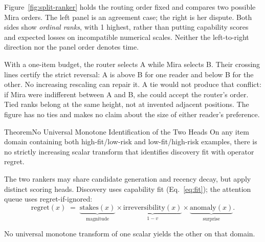 \documentclass[11pt,a4paper]{article}
\theoremstyle{definition}
\theoremstyle{plain}
\begin{document}
Figure~\ref{fig:split-ranker} holds the routing order fixed and compares two
possible Mira orders. The left panel is an agreement case; the right is her
dispute. Both sides show \emph{ordinal ranks}, with 1 highest, rather than
putting capability scores and expected losses on incompatible numerical
scales. Neither the left-to-right direction nor the panel order denotes time.



With a one-item budget, the router selects A while Mira selects B. Their
crossing lines certify the strict reversal: A is above B for one reader and
below B for the other. No increasing rescaling can repair it. A tie would
not produce that conflict: if Mira were indifferent between A and B, she
could accept the router's order. Tied ranks belong at the same height, not
at invented adjacent positions. The figure has no ties and makes no claim
about the size of either reader's preference.

%

\begin{pdclaim}{Theorem}{No Universal Monotone Identification of the Two Heads}
\setlength{\parskip}{4pt plus 1pt}
\label{thm:split-ranker}
On any item domain containing both high-fit/low-risk and low-fit/high-risk examples,
there is no strictly increasing scalar transform that identifies discovery fit with
operator regret.

The two rankers may share candidate generation and recency decay,
but apply distinct scoring heads. Discovery uses capability fit
(Eq.~\ref{eq:fit}); the attention queue uses regret-if-ignored:
\begin{equation}\label{eq:regret}
\mathrm{regret}(x) \;=\; \underbrace{\mathrm{stakes}(x)}_{\text{magnitude}}
   \times \underbrace{\mathrm{irreversibility}(x)}_{1-v}
   \times \underbrace{\mathrm{anomaly}(x)}_{\text{surprise}}.
\end{equation}

No universal monotone transform of one scalar yields the other on that domain.
\end{pdclaim}
\end{document}
